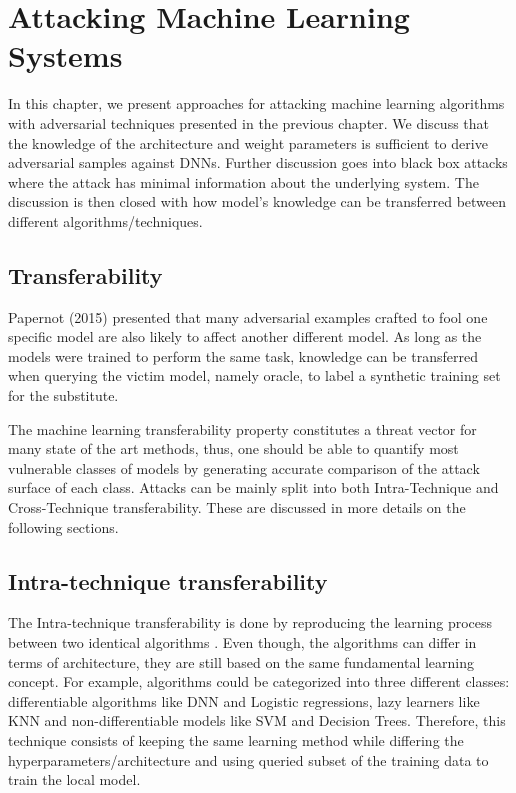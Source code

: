 \chapter{Attacking Machine Learning Systems}

In this chapter, we present approaches for attacking machine learning algorithms with adversarial techniques presented in the previous chapter. We discuss that the knowledge of the architecture and weight parameters is sufficient to derive adversarial samples against DNNs. Further discussion goes into black box attacks where the attack has minimal information about the underlying system. The discussion is then closed with how model's knowledge can be transferred between different algorithms/techniques.


\section{Transferability}

Papernot (2015) presented that many adversarial examples crafted to fool one specific model are also likely to affect another different model. As long as the models were trained to perform the same task, knowledge can be transferred when querying the victim model, namely oracle, to label a synthetic training set for the substitute.

The machine learning transferability property constitutes a threat vector for many state of the art methods, thus, one should be able to quantify most vulnerable classes of models by generating accurate comparison of the attack surface of each class. Attacks can be mainly split into both Intra-Technique and Cross-Technique transferability. These are discussed in more details on the following sections.

\section{Intra-technique transferability}

The Intra-technique transferability is done by reproducing the learning process between two identical algorithms \cite{papernot2016transf}. Even though, the algorithms can differ in terms of architecture, they are still based on the same fundamental learning concept. For example, algorithms could be categorized into three different classes: differentiable algorithms like DNN and Logistic regressions, lazy learners like KNN and non-differentiable models like SVM and Decision Trees. Therefore, this technique consists of keeping the same learning method while differing the hyperparameters/architecture and using queried subset of the training data to train the local model. 



